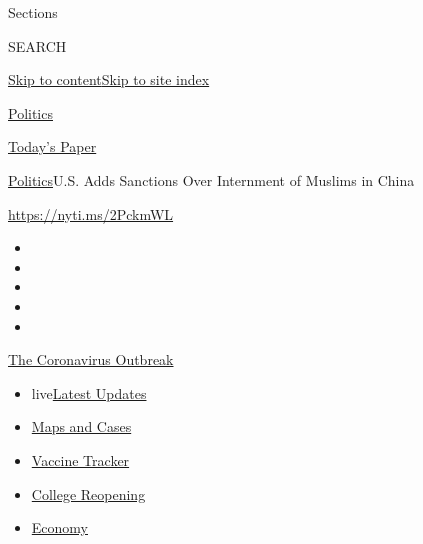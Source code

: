 Sections

SEARCH

\protect\hyperlink{site-content}{Skip to
content}\protect\hyperlink{site-index}{Skip to site index}

\href{https://www.nytimes.com/section/politics}{Politics}

\href{https://myaccount.nytimes.com/auth/login?response_type=cookie\&client_id=vi}{}

\href{https://www.nytimes.com/section/todayspaper}{Today's Paper}

\href{/section/politics}{Politics}\textbar{}U.S. Adds Sanctions Over
Internment of Muslims in China

\url{https://nyti.ms/2PckmWL}

\begin{itemize}
\item
\item
\item
\item
\item
\end{itemize}

\href{https://www.nytimes.com/news-event/coronavirus?action=click\&pgtype=Article\&state=default\&region=TOP_BANNER\&context=storylines_menu}{The
Coronavirus Outbreak}

\begin{itemize}
\tightlist
\item
  live\href{https://www.nytimes.com/2020/08/04/world/coronavirus-covid-19.html?action=click\&pgtype=Article\&state=default\&region=TOP_BANNER\&context=storylines_menu}{Latest
  Updates}
\item
  \href{https://www.nytimes.com/interactive/2020/us/coronavirus-us-cases.html?action=click\&pgtype=Article\&state=default\&region=TOP_BANNER\&context=storylines_menu}{Maps
  and Cases}
\item
  \href{https://www.nytimes.com/interactive/2020/science/coronavirus-vaccine-tracker.html?action=click\&pgtype=Article\&state=default\&region=TOP_BANNER\&context=storylines_menu}{Vaccine
  Tracker}
\item
  \href{https://www.nytimes.com/2020/08/02/us/covid-college-reopening.html?action=click\&pgtype=Article\&state=default\&region=TOP_BANNER\&context=storylines_menu}{College
  Reopening}
\item
  \href{https://www.nytimes.com/live/2020/08/03/business/stock-market-today-coronavirus?action=click\&pgtype=Article\&state=default\&region=TOP_BANNER\&context=storylines_menu}{Economy}
\end{itemize}

